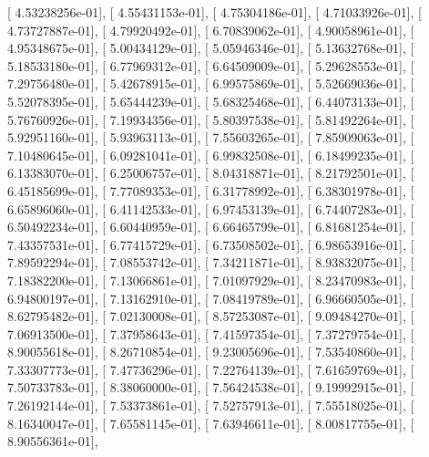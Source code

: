 \documentclass{article}
\begin{document}
       [  4.53238256e-01],
       [  4.55431153e-01],
       [  4.75304186e-01],
       [  4.71033926e-01],
       [  4.73727887e-01],
       [  4.79920492e-01],
       [  6.70839062e-01],
       [  4.90058961e-01],
       [  4.95348675e-01],
       [  5.00434129e-01],
       [  5.05946346e-01],
       [  5.13632768e-01],
       [  5.18533180e-01],
       [  6.77969312e-01],
       [  6.64509009e-01],
       [  5.29628553e-01],
       [  7.29756480e-01],
       [  5.42678915e-01],
       [  6.99575869e-01],
       [  5.52669036e-01],
       [  5.52078395e-01],
       [  5.65444239e-01],
       [  5.68325468e-01],
       [  6.44073133e-01],
       [  5.76760926e-01],
       [  7.19934356e-01],
       [  5.80397538e-01],
       [  5.81492264e-01],
       [  5.92951160e-01],
       [  5.93963113e-01],
       [  7.55603265e-01],
       [  7.85909063e-01],
       [  7.10480645e-01],
       [  6.09281041e-01],
       [  6.99832508e-01],
       [  6.18499235e-01],
       [  6.13383070e-01],
       [  6.25006757e-01],
       [  8.04318871e-01],
       [  8.21792501e-01],
       [  6.45185699e-01],
       [  7.77089353e-01],
       [  6.31778992e-01],
       [  6.38301978e-01],
       [  6.65896060e-01],
       [  6.41142533e-01],
       [  6.97453139e-01],
       [  6.74407283e-01],
       [  6.50492234e-01],
       [  6.60440959e-01],
       [  6.66465799e-01],
       [  6.81681254e-01],
       [  7.43357531e-01],
       [  6.77415729e-01],
       [  6.73508502e-01],
       [  6.98653916e-01],
       [  7.89592294e-01],
       [  7.08553742e-01],
       [  7.34211871e-01],
       [  8.93832075e-01],
       [  7.18382200e-01],
       [  7.13066861e-01],
       [  7.01097929e-01],
       [  8.23470983e-01],
       [  6.94800197e-01],
       [  7.13162910e-01],
       [  7.08419789e-01],
       [  6.96660505e-01],
       [  8.62795482e-01],
       [  7.02130008e-01],
       [  8.57253087e-01],
       [  9.09484270e-01],
       [  7.06913500e-01],
       [  7.37958643e-01],
       [  7.41597354e-01],
       [  7.37279754e-01],
       [  8.90055618e-01],
       [  8.26710854e-01],
       [  9.23005696e-01],
       [  7.53540860e-01],
       [  7.33307773e-01],
       [  7.47736296e-01],
       [  7.22764139e-01],
       [  7.61659769e-01],
       [  7.50733783e-01],
       [  8.38060000e-01],
       [  7.56424538e-01],
       [  9.19992915e-01],
       [  7.26192144e-01],
       [  7.53373861e-01],
       [  7.52757913e-01],
       [  7.55518025e-01],
       [  8.16340047e-01],
       [  7.65581145e-01],
       [  7.63946611e-01],
       [  8.00817755e-01],
       [  8.90556361e-01],
\end{document}
